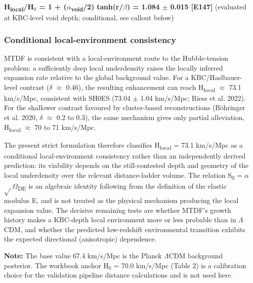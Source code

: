 \documentclass[11pt,a4paper]{article}
\begin{document}
\textbf{H\textsubscript{local}/H$_{0}$ = 1 + ($\alpha$\textsubscript{void}/2) tanh(r/\allowbreak{}$\beta$) = 1.084 $\pm$ 0.015 [E147]} {\small (evaluated at KBC-level void depth; conditional, see callout below)}

\begin{mdframed}[linecolor=accent,linewidth=0.5pt,backgroundcolor=callout-bg,leftline=true,rightline=true,topline=true,bottomline=true,innerleftmargin=8pt,innerrightmargin=8pt,innertopmargin=6pt,innerbottommargin=6pt]
\subsubsection{Conditional local-environment consistency}
MTDF is consistent with a local-environment route to the Hubble-tension problem: a sufficiently deep local underdensity raises the locally inferred expansion rate relative to the global background value. For a KBC/\allowbreak{}Haslbauer-level contrast ($\delta$ $\approx$ 0.46), the resulting enhancement can reach H\textsubscript{local} $\approx$ 73.1 km/\allowbreak{}s/\allowbreak{}Mpc, consistent with SH0ES (73.04 $\pm$ 1.04 km/\allowbreak{}s/\allowbreak{}Mpc; Riess et al. 2022). For the shallower contrast favoured by cluster-based reconstructions (B\"ohringer et al. 2020, $\delta$ $\approx$ 0.2 to 0.3), the same mechanism gives only partial alleviation, H\textsubscript{local} $\approx$ 70 to 71 km/\allowbreak{}s/\allowbreak{}Mpc.

The present strict formulation therefore classifies H\textsubscript{local} = 73.1 km/\allowbreak{}s/\allowbreak{}Mpc as a conditional local-environment consistency rather than an independently derived prediction: its viability depends on the still-contested depth and geometry of the local underdensity over the relevant distance-ladder volume. The relation S\textsubscript{0} = $\alpha$$\sqrt{\,}$$\Omega$\textsubscript{DE} is an algebraic identity following from the definition of the elastic modulus E, and is not treated as the physical mechanism producing the local expansion value. The decisive remaining tests are whether MTDF's growth history makes a KBC-depth local environment more or less probable than in $\Lambda$CDM, and whether the predicted low-redshift environmental transition exhibits the expected directional (anisotropic) dependence.

\textbf{Note:} The base value 67.4 km/\allowbreak{}s/\allowbreak{}Mpc is the Planck $\Lambda$CDM background posterior. The workbook anchor H$_{0}$ = 70.0 km/\allowbreak{}s/\allowbreak{}Mpc (Table 2) is a calibration choice for the validation pipeline distance calculations and is not used here.
\end{mdframed}
\end{document}
